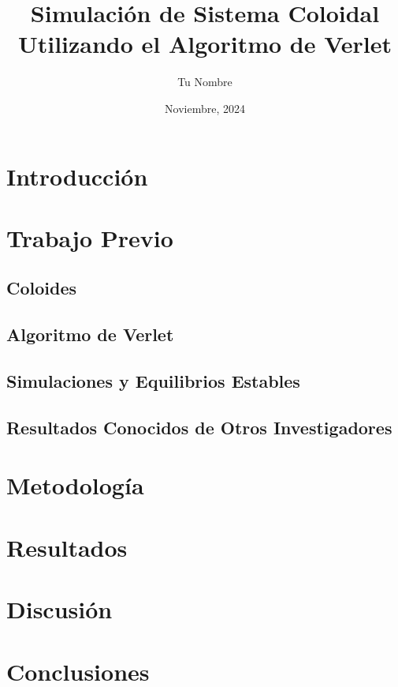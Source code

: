 \documentclass[twocolumn]{article}
\title{Simulación de Sistema Coloidal Utilizando el Algoritmo de Verlet}
\author{Tu Nombre}
\date{Noviembre, 2024}
\begin{document}
\maketitle

\begin{abstract}
\end{abstract}

\section{Introducción}

\section{Trabajo Previo}
\subsection*{Coloides}

\subsection*{Algoritmo de Verlet}

\subsection*{Simulaciones y Equilibrios Estables}

\subsection*{Resultados Conocidos de Otros Investigadores}

\section{Metodología}

\section{Resultados}

\section{Discusión}

\section{Conclusiones}

\begin{thebibliography}{9}
\end{thebibliography}
\end{document}
